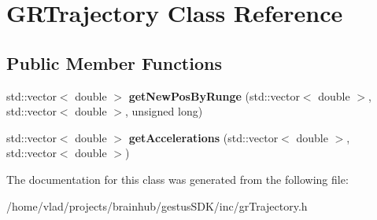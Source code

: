 \hypertarget{classGRTrajectory}{}\section{G\+R\+Trajectory Class Reference}
\label{classGRTrajectory}
\subsection*{Public Member Functions}
\begin{DoxyCompactItemize}
\item 
\mbox{\label{classGRTrajectory_aae41cdeef895b295e27bcf07a64d6307}} 
std\+::vector$<$ double $>$ {\bfseries get\+New\+Pos\+By\+Runge} (std\+::vector$<$ double $>$, std\+::vector$<$ double $>$, unsigned long)
\item 
\mbox{\label{classGRTrajectory_a2d6f58c0c68aeb6f0b0f20a082934789}} 
std\+::vector$<$ double $>$ {\bfseries get\+Accelerations} (std\+::vector$<$ double $>$, std\+::vector$<$ double $>$)
\end{DoxyCompactItemize}


The documentation for this class was generated from the following file\+:\begin{DoxyCompactItemize}
\item 
/home/vlad/projects/brainhub/gestus\+S\+D\+K/inc/gr\+Trajectory.\+h\end{DoxyCompactItemize}
